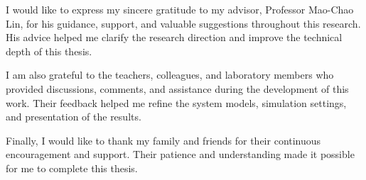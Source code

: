 
\begin{acknowledgement}

I would like to express my sincere gratitude to my advisor, Professor Mao-Chao Lin, for his guidance, support, and valuable suggestions throughout this research. His advice helped me clarify the research direction and improve the technical depth of this thesis.

I am also grateful to the teachers, colleagues, and laboratory members who provided discussions, comments, and assistance during the development of this work. Their feedback helped me refine the system models, simulation settings, and presentation of the results.

Finally, I would like to thank my family and friends for their continuous encouragement and support. Their patience and understanding made it possible for me to complete this thesis.

\end{acknowledgement}
